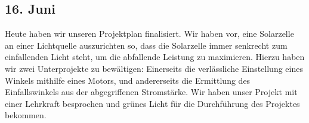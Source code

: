 \subsection{16. Juni}
Heute haben wir unseren Projektplan finalisiert. Wir haben vor, eine Solarzelle an einer Lichtquelle auszurichten so, dass die Solarzelle immer senkrecht zum einfallenden Licht steht, um die abfallende Leistung zu maximieren. Hierzu haben wir zwei Unterprojekte zu bewältigen: Einerseits die verlässliche Einstellung eines Winkels mithilfe eines Motors, und andererseits die Ermittlung des Einfallswinkels aus der abgegriffenen Stromstärke. Wir haben unser Projekt mit einer Lehrkraft besprochen und grünes Licht für die Durchführung des Projektes bekommen.